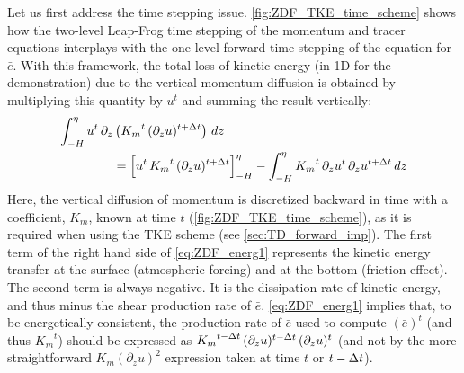 \documentclass[../main/NEMO_manual]{subfiles}
\begin{document}
Let us first address the time stepping issue. \autoref{fig:ZDF_TKE_time_scheme} shows how
the two-level Leap-Frog time stepping of the momentum and tracer equations interplays with
the one-level forward time stepping of the equation for $\bar{e}$.
With this framework, the total loss of kinetic energy (in 1D for the demonstration) due to
the vertical momentum diffusion is obtained by multiplying this quantity by $u^t$ and
summing the result vertically:
\begin{equation}
  \label{eq:ZDF_energ1}
  \begin{split}
    \int_{-H}^{\eta}  u^t \,\partial_z &\left( {K_m}^t \,(\partial_z u)^{t+\Delta t}  \right) \,dz   \\
    &= \Bigl[  u^t \,{K_m}^t \,(\partial_z u)^{t+\Delta t} \Bigr]_{-H}^{\eta}
    - \int_{-H}^{\eta}{ {K_m}^t \,\partial_z{u^t} \,\partial_z u^{t+\Delta t} \,dz }
  \end{split}
\end{equation}
Here, the vertical diffusion of momentum is discretized backward in time with a coefficient, $K_m$,
known at time $t$ (\autoref{fig:ZDF_TKE_time_scheme}), as it is required when using the TKE scheme
(see \autoref{sec:TD_forward_imp}).
The first term of the right hand side of \autoref{eq:ZDF_energ1} represents the kinetic energy transfer at
the surface (atmospheric forcing) and at the bottom (friction effect).
The second term is always negative.
It is the dissipation rate of kinetic energy, and thus minus the shear production rate of $\bar{e}$.
\autoref{eq:ZDF_energ1} implies that, to be energetically consistent,
the production rate of $\bar{e}$ used to compute $(\bar{e})^t$ (and thus ${K_m}^t$) should be expressed as
${K_m}^{t-\Delta t}\,(\partial_z u)^{t-\Delta t} \,(\partial_z u)^t$
(and not by the more straightforward $K_m \left( \partial_z u \right)^2$ expression taken at time $t$ or $t-\Delta t$).
\end{document}
